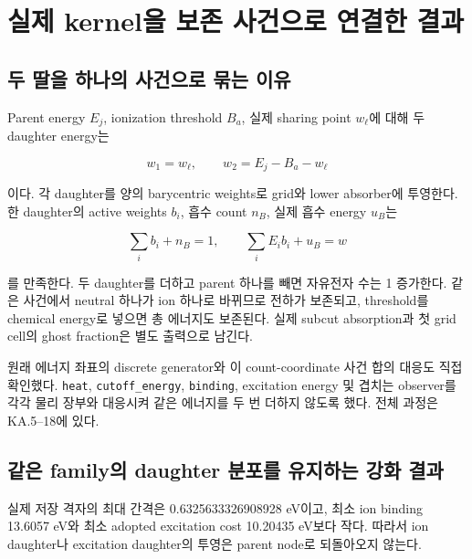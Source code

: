 \documentclass[11pt,a4paper]{article}
\begin{document}
\hypertarget{uxc2e4uxc81c-kerneluxc744-uxbcf4uxc874-uxc0acuxac74uxc73cuxb85c-uxc5f0uxacb0uxd55c-uxacb0uxacfc}{%
\section{실제 kernel을 보존 사건으로 연결한 결과}\label{uxc2e4uxc81c-kerneluxc744-uxbcf4uxc874-uxc0acuxac74uxc73cuxb85c-uxc5f0uxacb0uxd55c-uxacb0uxacfc}}

\hypertarget{uxb450-uxb538uxc744-uxd558uxb098uxc758-uxc0acuxac74uxc73cuxb85c-uxbb36uxb294-uxc774uxc720}{%
\subsection{두 딸을 하나의 사건으로 묶는 이유}\label{uxb450-uxb538uxc744-uxd558uxb098uxc758-uxc0acuxac74uxc73cuxb85c-uxbb36uxb294-uxc774uxc720}}

Parent energy \(E_j\), ionization threshold \(B_a\), 실제 sharing point \(w_\ell\)에 대해 두 daughter energy는

\[
w_1=w_\ell,\qquad w_2=E_j-B_a-w_\ell
\]

이다. 각 daughter를 양의 barycentric weights로 grid와 lower absorber에 투영한다. 한 daughter의 active weights \(b_i\), 흡수 count \(n_B\), 실제 흡수 energy \(u_B\)는

\[
\sum_i b_i+n_B=1,\qquad \sum_iE_i b_i+u_B=w
\]

를 만족한다. 두 daughter를 더하고 parent 하나를 빼면 자유전자 수는 1 증가한다. 같은 사건에서 neutral 하나가 ion 하나로 바뀌므로 전하가 보존되고, threshold를 chemical energy로 넣으면 총 에너지도 보존된다. 실제 subcut absorption과 첫 grid cell의 ghost fraction은 별도 출력으로 남긴다.

원래 에너지 좌표의 discrete generator와 이 count-coordinate 사건 합의 대응도 직접 확인했다. \texttt{heat}, \texttt{cutoff\_energy}, \texttt{binding}, excitation energy 및 겹치는 observer를 각각 물리 장부와 대응시켜 같은 에너지를 두 번 더하지 않도록 했다. 전체 과정은 KA.5--18에 있다.

\hypertarget{uxac19uxc740-familyuxc758-daughter-uxbd84uxd3ecuxb97c-uxc720uxc9c0uxd558uxb294-uxac15uxd654-uxacb0uxacfc}{%
\subsection{같은 family의 daughter 분포를 유지하는 강화 결과}\label{uxac19uxc740-familyuxc758-daughter-uxbd84uxd3ecuxb97c-uxc720uxc9c0uxd558uxb294-uxac15uxd654-uxacb0uxacfc}}

실제 저장 격자의 최대 간격은 0.6325633326908928 eV이고, 최소 ion binding 13.6057 eV와 최소 adopted excitation cost 10.20435 eV보다 작다. 따라서 ion daughter나 excitation daughter의 투영은 parent node로 되돌아오지 않는다.
\end{document}
